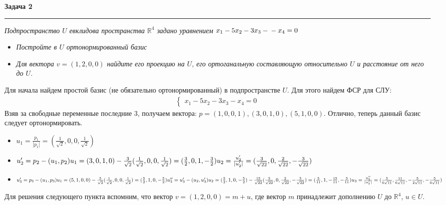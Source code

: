\documentclass[a4paper,11pt]{article}
\begin{document}




\textbf{\large Задача 2}
\medskip\hrule\medskip
\textit{Подпространство $ U $ евклидова пространства $ \mathbb{R}^4 $ задано уравнением $ x_1 - 5x_2 - 3x_3 - \\ - x_4 = 0 $}
\begin{itemize}
\item \textit{Постройте в $ U $ ортонормированный базис}
\item \textit{Для вектора $ v = (1, 2, 0, 0) $ найдите его проекцию на $ U $, его ортоганальную составляющую относительно $ U $ и расстояние от него до $ U $.}
\end{itemize} 
Для начала найдем простой базис (не обязательно ортонормированный) в подпространстве $ U $. Для этого найдем ФСР для СЛУ:
\begin{gather*}
\begin{cases}
x_1 - 5x_2 - 3x_3 - x_4 = 0
\end{cases}
\end{gather*}
Взяв за свободные переменные последние 3, получаем вектора: $p =  (1, 0, 0, 1), (3, 0, 1, 0), (5, 1, 0, 0) $. Отлично, теперь данный базис следует ортонормировать.
\begin{itemize}
\item $ u_1 = \frac{p_1}{|p_1|} = (\frac1{\sqrt{2}}, 0, 0, \frac1{\sqrt{2}}) $
\item $ u_2' = p_2 - (u_1, p_2)u_1 = (3, 0, 1, 0) - \frac{3}{\sqrt{2}}(\frac1{\sqrt{2}}, 0, 0, \frac1{\sqrt{2}}) = (\frac32, 0, 1, -\frac32)  \\[2pt]
u_2 = \frac{u_2'}{|u_2'|} = (\frac3{\sqrt{22}}, 0, \frac2{\sqrt{22}}, -\frac3{\sqrt{22}})$
\item $ u_3' = p_3 - (u_1, p_3)u_1 = (5, 1, 0, 0) - \frac5{\sqrt{2}}(\frac1{\sqrt{2}}, 0, 0, \frac1{\sqrt{2}}) = (\frac52, 1, 0, -\frac52) \\[2pt]
u_3'' = u_3' - (u_2, u_3')u_2 = (\frac52, 1, 0, -\frac52) - \frac{15}{\sqrt{22}}(\frac3{\sqrt{22}}, 0, \frac2{\sqrt{22}}, -\frac3{\sqrt{22}}) =  (\frac5{11}, 1, -\frac{15}{11}, -\frac{5}{11})\\[2pt]
u_3 = \frac{u_3''}{|u_3''|} = (\frac5{6\sqrt{11}}, \frac{11}{6\sqrt{11}}, -\frac{5}{2\sqrt{11}}, -\frac5{6\sqrt{11}})$ 
\end{itemize}
Для решения следующего пункта вспомним, что вектор $ v = (1, 2, 0, 0) = m + u $, где вектор $ m $ принадлежит дополнению $ U $ до $ \mathbb{R}^4 $, $ u \in U $. \\[2pt]
\end{document}
